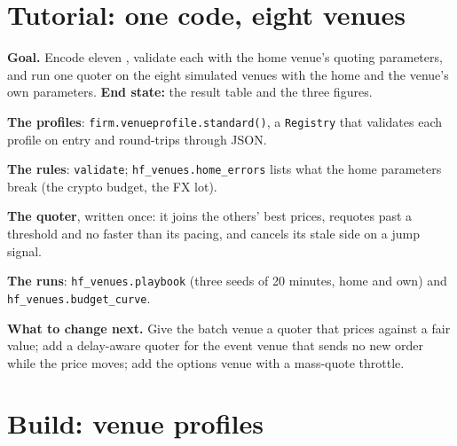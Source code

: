 \section{Tutorial: one code, eight venues}\label{tut:hf:a-venue-playbook:tut}

\begin{tutorial}
\textbf{Goal.} Encode eleven , validate each with the home venue's quoting parameters, and run one quoter on the eight simulated venues
with the home and the venue's own parameters. \textbf{End state:} the result table and the three figures.
\begin{tutsteps}
\item \textbf{The profiles}: \texttt{firm.venueprofile.standard()}, a \texttt{Registry} that validates each profile on entry and round-trips through
JSON.
\item \textbf{The rules}: \texttt{validate}; \texttt{hf\_venues.home\_errors} lists what the home parameters break (the crypto budget, the FX lot).
\label{lst:hf:a-venue-playbook:validate}
\item \textbf{The quoter}, written once: it joins the others' best prices, requotes past a threshold and no faster than its pacing, and cancels
its stale side on a jump signal.
\label{lst:hf:a-venue-playbook:quoter}
\item \textbf{The runs}: \texttt{hf\_venues.playbook} (three seeds of 20 minutes, home and own) and \texttt{hf\_venues.budget\_curve}.
\end{tutsteps}
\textbf{What to change next.} Give the batch venue a quoter that prices against a fair value; add a delay-aware quoter for the event venue that
sends no new order while the price moves; add the options venue with a mass-quote throttle.
\end{tutorial}

\section{Build: venue profiles}\label{bld:hf:a-venue-playbook:venueprofile}

